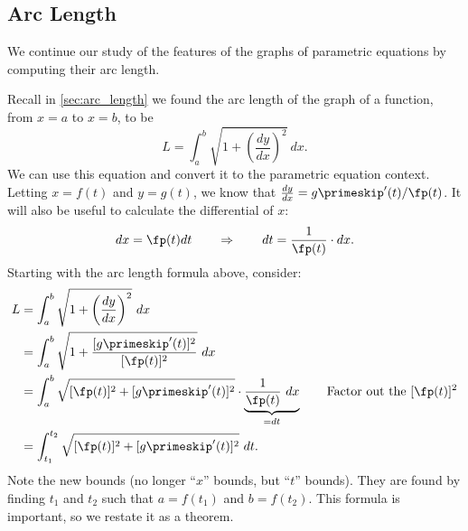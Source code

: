 

\subsection{Arc Length}

We continue our study of the features of the graphs of parametric equations by computing their arc length.

Recall in \autoref{sec:arc_length} we found the arc length of the graph of a function, from $x=a$ to $x=b$, to be
\[L = \int_a^b\sqrt{1+\left(\frac{dy}{dx}\right)^2}\ dx.\]
We can use this equation and convert it to the parametric equation context. Letting $x=f(t)$ and $y=g(t)$, we know that $\frac{dy}{dx} = g\primeskip'(t)/\fp(t)$. It will also be useful to calculate the differential of $x$:
\[dx = \fp(t)dt \qquad \Rightarrow \qquad dt = \frac{1}{\fp(t)}\cdot dx.\]
Starting with the arc length formula above, consider:
\begin{align*}
	L &= \int_a^b\sqrt{1+\left(\frac{dy}{dx}\right)^2}\ dx\\
	&= \int_a^b \sqrt{1+\frac{[g\primeskip'(t)]^2}{[\fp(t)]^2}}\ dx \\
	&= \int_a^b \sqrt{[\fp(t)]^2+[g\primeskip'(t)]^2}\cdot\underbrace{\frac1{\fp(t)}\ dx}_{=dt} \qquad\text{Factor out the $[\fp(t)]^2$} \\
	&= \int_{t_1}^{t_2} \sqrt{[\fp(t)]^2+[g\primeskip'(t)]^2}\ dt.\\
\end{align*}
Note the new bounds (no longer ``$x$'' bounds, but ``$t$'' bounds). They are found by finding $t_1$ and $t_2$ such that $a= f(t_1)$ and $b=f(t_2)$. This formula is important, so we restate it as a theorem.

